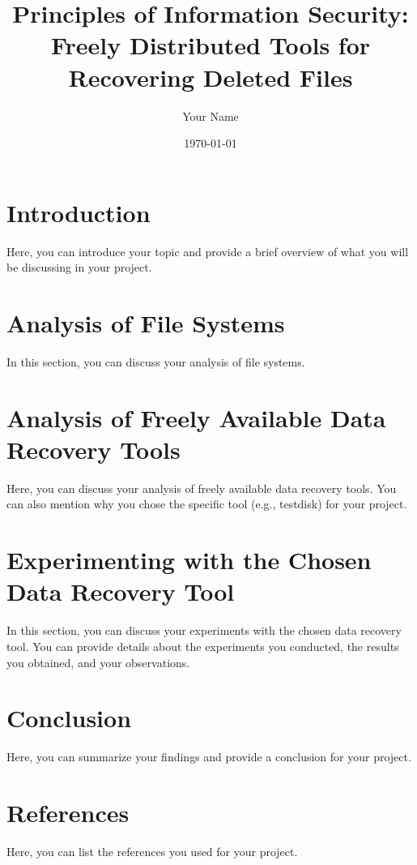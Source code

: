 \documentclass[12pt,a4paper]{article}
\title{Principles of Information Security: Freely Distributed Tools for Recovering Deleted Files}
\author{Your Name}
\date{\today}
\begin{document}
\maketitle

\section{Introduction}
Here, you can introduce your topic and provide a brief overview of what you will be discussing in your project.

\section{Analysis of File Systems}
In this section, you can discuss your analysis of file systems.

\section{Analysis of Freely Available Data Recovery Tools}
Here, you can discuss your analysis of freely available data recovery tools. You can also mention why you chose the specific tool (e.g., testdisk) for your project.

\section{Experimenting with the Chosen Data Recovery Tool}
In this section, you can discuss your experiments with the chosen data recovery tool. You can provide details about the experiments you conducted, the results you obtained, and your observations.

\section{Conclusion}
Here, you can summarize your findings and provide a conclusion for your project.

\section{References}
Here, you can list the references you used for your project.
\end{document}
